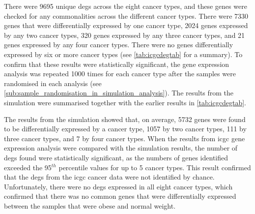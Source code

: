 There were 9695 unique \glspl{deg} across the eight cancer types, and these genes were checked for any commonalities across the different cancer types.
There were 7330 genes that were differentially expressed by one cancer type, 2024 genes expressed by any two cancer types, 320 genes expressed by any three cancer types, and 21 genes expressed by any four cancer types.
There were no genes differentially expressed by six or more cancer types (see \cref{tab:icgcdegtab} for a summary).
To confirm that these results were statistically significant, the gene expression analysis was repeated 1000 times for each cancer type after the samples were randomised in each analysis (see \cref{sub:sample_randomisation_in_simulation_analysis}).
The results from the simulation were summarised together with the earlier results in \cref{tab:icgcdegtab}.

The results from the simulation showed that, on average, 5732 genes were found to be differentially expressed by a cancer type, 1057 by two cancer types, 111 by three cancer types, and 7 by four cancer types.
When the results from \gls{icgc} gene expression analysis were compared with the simulation results, the number of \glspl{deg} found were statistically significant, as the numbers of genes identified exceeded the 95$^{th}$ percentile values for up to 5 cancer types.
This result confirmed that the \glspl{deg} from the \gls{icgc} cancer data were not identified by chance.
Unfortunately, there were no \glspl{deg} expressed in all eight cancer types, which confirmed that there was no common genes that were differentially expressed between the samples that were obese and normal weight.

